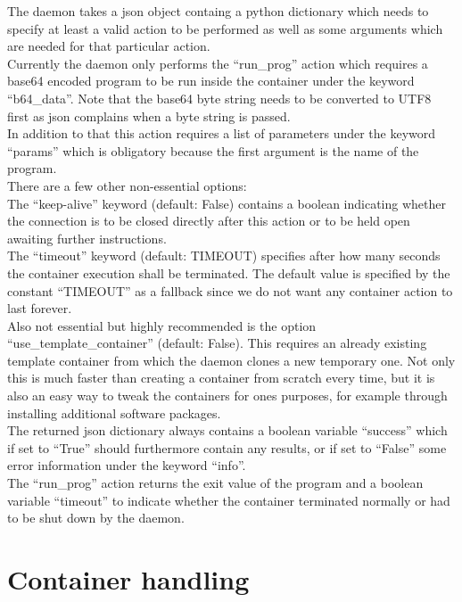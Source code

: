 The daemon takes a json object containg a python dictionary which needs to specify at least a valid action to
be performed as well as some arguments which are needed for that particular action.\\
Currently the daemon only performs the ``run\_prog'' action which requires a base64 encoded program to be run
inside the container under the keyword ``b64\_data''. Note that the base64 byte string needs to be converted to
UTF8 first as json complains when a byte string is passed.\\
In addition to that this action requires a list of parameters under the keyword ``params'' which is obligatory
because the first argument is the name of the program.\\
There are a few other non-essential options:\\
The ``keep-alive'' keyword (default: False) contains a boolean indicating whether the connection is to be closed
directly after this action or to be held open awaiting further instructions.\\
The ``timeout'' keyword (default: TIMEOUT) specifies after how many seconds the container execution shall be
terminated. The default value is specified by the constant ``TIMEOUT'' as a fallback since we do not want any
container action to last forever.\\
Also not essential but highly recommended is the option ``use\_template\_container'' (default: False). This
requires an already existing template container from which the daemon clones a new temporary one. Not only
this is much faster than creating a container from scratch every time, but it is also an easy way to tweak
the containers for ones purposes, for example through installing additional software packages.\\
The returned json dictionary always contains a boolean variable ``success'' which if set to ``True'' should
furthermore contain any results, or if set to ``False'' some error information under the keyword ``info''.\\
The ``run\_prog'' action returns the exit value of the program and a boolean variable ``timeout'' to indicate
whether the container terminated normally or had to be shut down by the daemon.

\section{Container handling}

